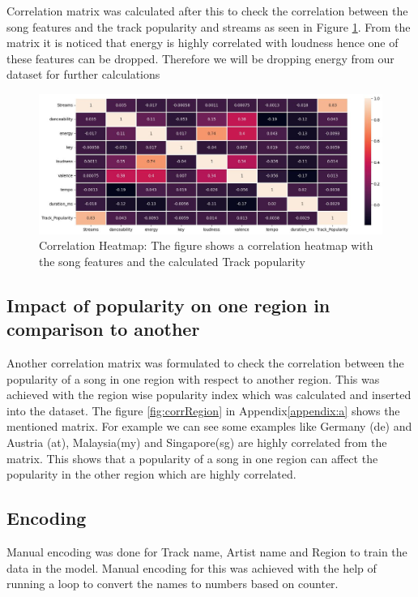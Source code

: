 \documentclass{article}
\begin{document}
Correlation matrix was calculated after this to check the correlation between the song features and the track popularity and streams as seen in Figure \ref{fig:Heatmap}. From the matrix it is noticed that energy is highly correlated with loudness hence one of these features can be dropped. Therefore we will be dropping energy from our dataset for further calculations

\begin{figure}[htbp]
    \centering
    \includegraphics[scale = 0.40]{Figures/corrMatFeatures.jpeg}
    \caption{Correlation Heatmap: The figure shows a correlation heatmap with the song features and the calculated Track popularity}
    \label{fig:Heatmap}
\end{figure} 

\subsection{Impact of popularity on one region in comparison to another}
Another correlation matrix was formulated to check the correlation between the popularity of a song in one region with respect to another region. This was achieved with the region wise popularity index which was calculated and inserted into the dataset. The figure \ref{fig:corrRegion} in Appendix\ref{appendix:a} shows the mentioned matrix. For example we can see some examples like Germany (de) and Austria (at), Malaysia(my) and Singapore(sg) are highly correlated from the matrix. This shows that a popularity of a song in one region can affect the popularity in the other region which are highly correlated.

\subsection{Encoding}
Manual encoding was done for Track name, Artist name and Region to train the data in the model. Manual encoding for this was achieved with the help of running a loop to convert the names to numbers based on counter.
\end{document}
